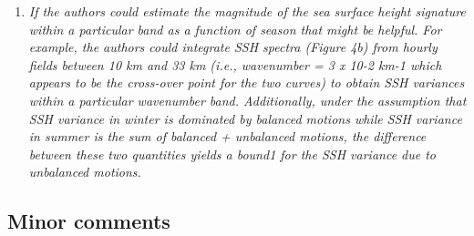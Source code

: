 \documentclass[11pt]{article}
\begin{document}
\begin{enumerate}
 \item {\it If the authors could estimate the magnitude of the sea surface height signature within a
        particular band as a function of season that might be helpful. For example, the authors could
        integrate SSH spectra (Figure 4b) from hourly fields between 10 km and 33 km (i.e.,
        wavenumber = 3 x 10-2 km-1 which appears to be the cross-over point for the two curves) to
        obtain SSH variances within a particular wavenumber band. Additionally, under the
        assumption that SSH variance in winter is dominated by balanced motions while SSH
        variance in summer is the sum of balanced + unbalanced motions, the difference between
        these two quantities yields a bound1 for the SSH variance due to unbalanced motions.}

\end{enumerate}

\subsection{Minor comments}
\end{document}
